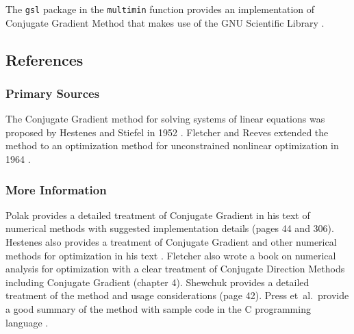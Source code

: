 The \texttt{gsl} package in the \texttt{multimin} function provides an implementation of Conjugate Gradient Method that makes use of the GNU Scientific Library \cite{Hankin2011}.


\subsection{References}

\subsubsection{Primary Sources}
The Conjugate Gradient method for solving systems of linear equations was proposed by Hestenes and Stiefel in 1952 \cite{Hestenes1952}.
Fletcher and Reeves extended the method to an optimization method for unconstrained nonlinear optimization in 1964 \cite{Fletcher1964}.

\subsubsection{More Information}
Polak provides a detailed treatment of Conjugate Gradient in his text of numerical methods with suggested implementation details \cite{Polak1971} (pages 44 and 306).
Hestenes also provides a treatment of Conjugate Gradient and other numerical methods for optimization in his text \cite{Hestenes1980}.
Fletcher also wrote a book on numerical analysis for optimization with a clear treatment of Conjugate Direction Methods including Conjugate Gradient \cite{Fletcher2000} (chapter 4).
Shewchuk provides a detailed treatment of the method and usage considerations \cite{Shewchuk1994} (page 42).
Press et~al.\ provide a good summary of the method with sample code in the C programming language \cite{Press2007}.

